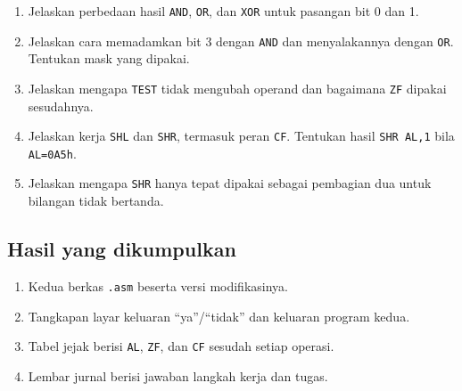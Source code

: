 \begin{enumerate}
    \item Jelaskan perbedaan hasil \texttt{AND}, \texttt{OR}, dan
          \texttt{XOR} untuk pasangan bit 0 dan 1.
    \item Jelaskan cara memadamkan bit 3 dengan \texttt{AND} dan
          menyalakannya dengan \texttt{OR}. Tentukan mask yang
          dipakai.
    \item Jelaskan mengapa \texttt{TEST} tidak mengubah operand dan
          bagaimana \texttt{ZF} dipakai sesudahnya.
    \item Jelaskan kerja \texttt{SHL} dan \texttt{SHR}, termasuk peran
          \texttt{CF}. Tentukan hasil \texttt{SHR AL,1} bila
          \texttt{AL=0A5h}.
    \item Jelaskan mengapa \texttt{SHR} hanya tepat dipakai sebagai
          pembagian dua untuk bilangan tidak bertanda.
\end{enumerate}

\subsection{Hasil yang dikumpulkan}

\begin{enumerate}
    \item Kedua berkas \texttt{.asm} beserta versi modifikasinya.
    \item Tangkapan layar keluaran ``ya''/``tidak'' dan keluaran
          program kedua.
    \item Tabel jejak berisi \texttt{AL}, \texttt{ZF}, dan
          \texttt{CF} sesudah setiap operasi.
    \item Lembar jurnal berisi jawaban langkah kerja dan tugas.
\end{enumerate}
